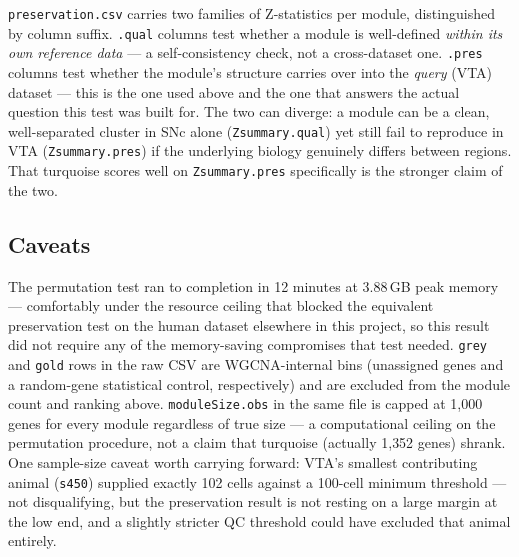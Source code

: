 \documentclass[11pt]{article}
\begin{document}
\texttt{preservation.csv} carries two families of Z-statistics per module,
distinguished by column suffix. \texttt{.qual} columns test whether a
module is well-defined \emph{within its own reference data} --- a
self-consistency check, not a cross-dataset one. \texttt{.pres} columns
test whether the module's structure carries over into the \emph{query}
(VTA) dataset --- this is the one used above and the one that answers the
actual question this test was built for. The two can diverge: a module can
be a clean, well-separated cluster in SNc alone (\texttt{Zsummary.qual}) yet
still fail to reproduce in VTA (\texttt{Zsummary.pres}) if the underlying
biology genuinely differs between regions. That turquoise scores well on
\texttt{Zsummary.pres} specifically is the stronger claim of the two.

\subsection*{Caveats}

The permutation test ran to completion in 12 minutes at 3.88\,GB peak
memory --- comfortably under the resource ceiling that blocked the
equivalent preservation test on the human dataset elsewhere in this
project, so this result did not require any of the memory-saving
compromises that test needed. \texttt{grey} and \texttt{gold} rows in the
raw CSV are WGCNA-internal bins (unassigned genes and a random-gene
statistical control, respectively) and are excluded from the module count
and ranking above. \texttt{moduleSize.obs} in the same file is capped at
1{,}000 genes for every module regardless of true size --- a computational
ceiling on the permutation procedure, not a claim that turquoise (actually
1{,}352 genes) shrank. One sample-size caveat worth carrying forward: VTA's
smallest contributing animal (\texttt{s450}) supplied exactly 102 cells
against a 100-cell minimum threshold --- not disqualifying, but the
preservation result is not resting on a large margin at the low end, and a
slightly stricter QC threshold could have excluded that animal entirely.
\end{document}
